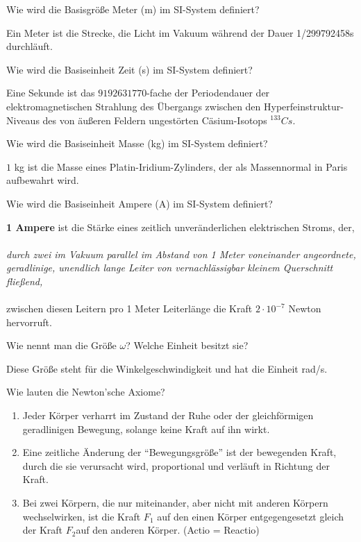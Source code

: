 \documentclass[12pt,a4paper,ngerman]{article}
\begin{document}
\begin{framed}
Wie wird die Basisgröße Meter (m) im SI-System definiert?
\end{framed}


Ein Meter ist die Strecke, die Licht im Vakuum während der
Dauer 1/299792458s durchläuft.


\begin{framed}
Wie wird die Basiseinheit Zeit (s) im SI-System definiert?
\end{framed}


Eine Sekunde ist das $9192631770$-fache der Periodendauer der elektromagnetischen Strahlung des Übergangs zwischen den Hyperfeinstruktur-Niveaus des von äußeren Feldern ungestörten Cäsium-Isotops $^{133}Cs$.


\begin{framed}
Wie wird die Basiseinheit Masse (kg) im SI-System definiert?
\end{framed}

$1$ kg ist die Masse eines Platin-Iridium-Zylinders, der als Massennormal in Paris aufbewahrt wird.



\begin{framed}
Wie wird die Basiseinheit Ampere (A) im SI-System definiert?
\end{framed}

\textbf{1 Ampere} ist die Stärke eines zeitlich unveränderlichen elektrischen Stroms, der, \\ \\ \textit{durch zwei im Vakuum parallel im Abstand von 1 Meter voneinander angeordnete, geradlinige, unendlich lange Leiter von vernachlässigbar kleinem Querschnitt fließend,} \\ \\ zwischen diesen Leitern pro 1 Meter Leiterlänge die Kraft $2 \cdot 10^{-7}$ Newton hervorruft. 


\begin{framed}
Wie nennt man die Größe $\omega$? Welche Einheit besitzt sie?
\end{framed}

Diese Größe steht für die Winkelgeschwindigkeit und hat die Einheit rad/s.


\begin{framed}
Wie lauten die Newton'sche Axiome?
\end{framed}

\begin{enumerate}
\item Jeder Körper verharrt im Zustand der Ruhe oder der gleichförmigen
geradlinigen Bewegung, solange keine Kraft auf ihn wirkt.
\item Eine zeitliche Änderung der ``Bewegungsgröße'' ist der
bewegenden Kraft, durch die sie verursacht wird, proportional und
verläuft in Richtung der Kraft.
\item Bei zwei Körpern, die nur miteinander, aber nicht mit anderen
Körpern wechselwirken, ist die Kraft $F_{1}$ auf den einen Körper
entgegengesetzt gleich der Kraft $F_{2}$auf den anderen Körper. (Actio
= Reactio)
\end{enumerate}
\end{document}
